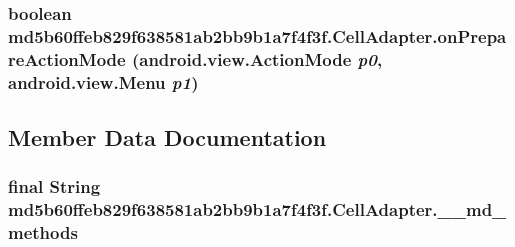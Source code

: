 \hypertarget{classmd5b60ffeb829f638581ab2bb9b1a7f4f3f_1_1_cell_adapter_51d520fe6621a42e3dc8c690d1e763c0}{
\subsubsection[{onPrepareActionMode}]{\setlength{\rightskip}{0pt plus 5cm}boolean md5b60ffeb829f638581ab2bb9b1a7f4f3f.CellAdapter.onPrepareActionMode (android.view.ActionMode {\em p0}, \/  android.view.Menu {\em p1})}}
\label{classmd5b60ffeb829f638581ab2bb9b1a7f4f3f_1_1_cell_adapter_51d520fe6621a42e3dc8c690d1e763c0}




\subsection{Member Data Documentation}
\hypertarget{classmd5b60ffeb829f638581ab2bb9b1a7f4f3f_1_1_cell_adapter_be33e45a7b887b1383f9c0ebda43ef00}{
\subsubsection[{\_\-\_\-md\_\-methods}]{\setlength{\rightskip}{0pt plus 5cm}final String {\bf md5b60ffeb829f638581ab2bb9b1a7f4f3f.CellAdapter.\_\-\_\-md\_\-methods}}}
\label{classmd5b60ffeb829f638581ab2bb9b1a7f4f3f_1_1_cell_adapter_be33e45a7b887b1383f9c0ebda43ef00}




